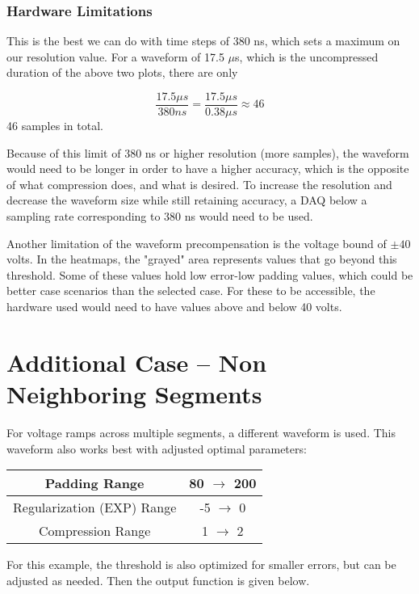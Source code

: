 \subsubsection{Hardware Limitations}
This is the best we can do with time steps of 380 ns, which sets a maximum on our resolution value. For a waveform of 17.5 $\mu$s, which is the uncompressed duration of the above two plots, there are only

\begin{equation}
    \dfrac{17.5 \mu s}{380 ns} = \dfrac{17.5 \mu s}{0.38 \mu s} \approx 46
\end{equation}
46 samples in total. 

Because of this limit of 380 ns or higher resolution (more samples), the waveform would need to be longer in order to have a higher accuracy, which is the opposite of what compression does, and what is desired. To increase the resolution and decrease the waveform size while still retaining accuracy, a DAQ below a sampling rate corresponding to 380 ns would need to be used. 

Another limitation of the waveform precompensation is the voltage bound of $\pm 40 $ volts. In the heatmaps, the "grayed" area represents values that go beyond this threshold. Some of these values hold low error-low padding values, which could be better case scenarios than the selected case. For these to be accessible, the hardware used would need to have values above and below 40 volts.

\section{Additional Case -- Non Neighboring Segments}
For voltage ramps across multiple segments, a different waveform is used. This waveform also works best with adjusted optimal parameters:

\begin{center}
\begin{tabular}{ | c | c | } 
  \hline
   Padding Range & 80 $\rightarrow$ 200 \\ 
  \hline
  Regularization (EXP) Range & -5 $\rightarrow$ 0 \\ 
  \hline
  Compression Range & 1 $\rightarrow$ 2 \\ 
  \hline
\end{tabular}
\end{center}

For this example, the threshold is also optimized for smaller errors, but can be adjusted as needed. Then the output function is given below.

